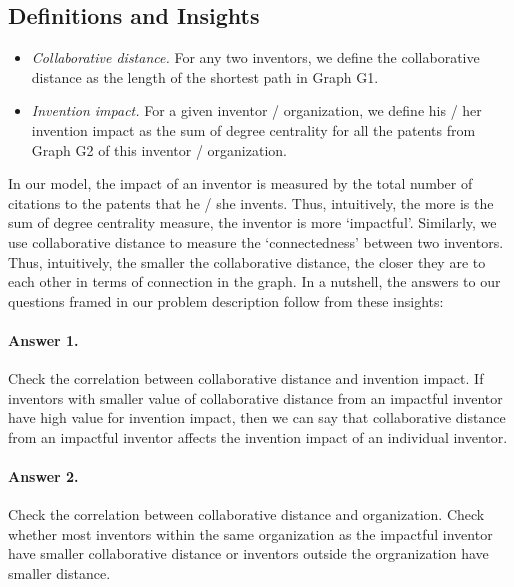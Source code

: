 \subsection{Definitions and Insights}

	\begin{itemize}
		\item {\em Collaborative distance.} For any two inventors, we define
		the collaborative distance as the length of the shortest path in
		Graph G1.
		\item {\em Invention impact.} For a given inventor / organization, we define his /
		her invention impact as the sum of degree centrality for
		all the patents from Graph G2 of this inventor / organization.
	\end{itemize}


In our model, the impact of an inventor is measured by the total number of citations
to the patents that he / she invents. Thus, intuitively, the more is the sum of degree
centrality measure, the inventor is more `impactful'. Similarly, we use
collaborative distance to measure the `connectedness' between two inventors.
Thus, intuitively, the smaller the collaborative distance, the closer they are
to each other in terms of connection in the graph.  In a nutshell, the answers
to our questions framed in our problem description follow from these insights:

\paragraph{Answer 1.} Check the correlation between collaborative distance and invention impact.
If inventors with smaller value of collaborative distance from an impactful inventor have 
high value for invention impact, then we can say that collaborative distance from an impactful inventor
affects the invention impact of an individual inventor.

\paragraph{Answer 2.} Check the correlation between collaborative distance and organization.
Check whether most inventors within the same organization as the impactful inventor
have smaller collaborative distance or inventors outside the orgranization have
smaller distance.

